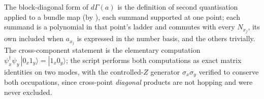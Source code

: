 The block-diagonal form of $d\Gamma(a)$ is the definition of second quantisation applied to a bundle map (by ), each summand supported at one point; each summand is a polynomial in that point's ladder and commutes with every $N_{x_j}$, its own included when $a_{x_j}$ is expressed in the number basis, and the others trivially. The cross-component statement is the elementary computation $\psi^{\dagger}_x\psi_y\,|0_x 1_y\rangle = |1_x 0_y\rangle$; the script performs both computations as exact matrix identities on two modes, with the controlled-$Z$ generator $\sigma_x\sigma_y$ verified to conserve both occupations, since cross-point \emph{diagonal} products are not hopping and were never excluded.
